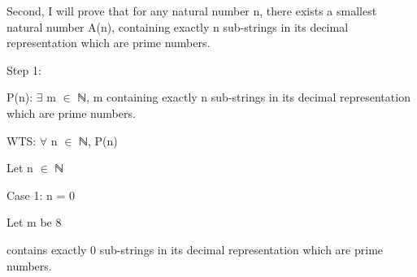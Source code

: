 \documentclass[12pt]{article}
\renewcommand{\_}{\kern-1.5pt\textunderscore\kern-1.5pt}
\begin{document}
\begin{enumerate}
\begin{enumerate}
\vspace{\baselineskip}
\begin{FlushLeft}
{\fontsize{14pt}{16.8pt}\selectfont Second, I will prove that for any natural number n, there exists a smallest natural number A(n), containing exactly n sub-strings in its decimal representation which are prime numbers.\par}
\end{FlushLeft}\par


\vspace{\baselineskip}
\begin{FlushLeft}
{\fontsize{14pt}{16.8pt}\selectfont Step 1:\par}
\end{FlushLeft}\par

\begin{FlushLeft}
{\fontsize{14pt}{16.8pt}\selectfont P(n): $ \exists $  m $ \in $  ℕ, m containing exactly n sub-strings in its decimal representation which are prime numbers.\par}
\end{FlushLeft}\par

\begin{FlushLeft}
{\fontsize{14pt}{16.8pt}\selectfont WTS: $ \forall $  n $ \in $  ℕ, P(n)\par}
\end{FlushLeft}\par

\begin{FlushLeft}
{\fontsize{14pt}{16.8pt}\selectfont Let n $ \in $  ℕ\par}
\end{FlushLeft}\par

\begin{FlushLeft}
{\fontsize{14pt}{16.8pt}\selectfont Case 1: n = 0\par}
\end{FlushLeft}\par

\begin{FlushLeft}
{\fontsize{14pt}{16.8pt}\selectfont \tab Let m be 8\par}
\end{FlushLeft}\par

\begin{FlushLeft}
{\fontsize{14pt}{16.8pt} contains exactly 0 sub-strings in its decimal representation which are prime numbers.\par}
\end{FlushLeft}\par


\end{enumerate}
\end{enumerate}
\end{document}

